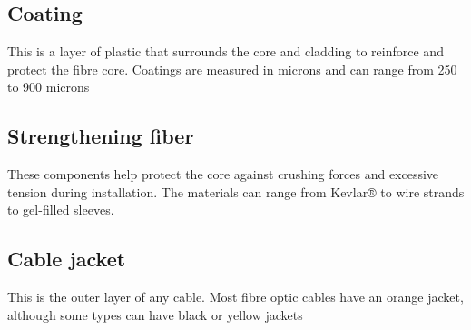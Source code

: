\documentclass[12pt]{report}
\begin{document}
	\subsection*{Coating}
	This is a layer of plastic that surrounds the core and cladding to reinforce and protect the fibre core. Coatings are measured in microns and can range from 250 to 900 microns
	\subsection*{ Strengthening fiber } 
	These components help protect the core against crushing forces and excessive tension during installation. The materials can range from Kevlar® to wire strands to gel-filled sleeves. 
	\subsection*{Cable jacket}
	This is the outer layer of any cable. Most fibre optic cables have an orange jacket, although some types can have black or yellow jackets
\end{document}

